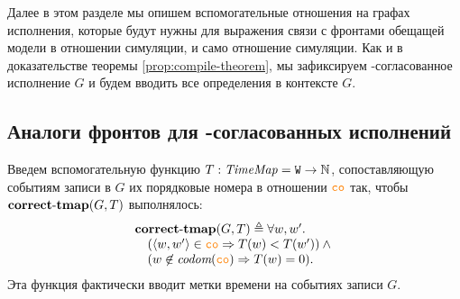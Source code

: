   Далее в этом разделе мы опишем вспомогательные отношения на графах исполнения, которые будут нужны для выражения
  связи с фронтами обещащей модели в отношении симуляции, и само отношение симуляции.
  Как и в доказательстве теоремы \ref{prop:compile-theorem}, мы зафиксируем \ARM-согласованное исполнение $G$ и будем вводить
  все определения в контексте $G$.
  
\subsection{Аналоги фронтов для \ARM-согласованных исполнений}
\label{sec:view}

  Введем вспомогательную функцию $T: \mathit{TimeMap} = {\mathtt{W}} \rightarrow \mathbb{N}$,
  сопоставляющую событиям записи в $G$ их порядковые номера в отношении $\lCO$ так, чтобы ${\rm \bf correct\text{-}tmap}(G, T)$ выполнялось:
  \[\inarr{
    \correctTmap(G, T) \defeq \forall w, w'. \; \\
    \quad (\tup{w, w'} \in \lCO \implies T(w) < T(w')) \land {} \\
    \quad (w \nin \codom{\lCO} \implies T(w) = 0).
  }\]
  Эта функция фактически вводит метки времени на событиях записи $G$.
  
